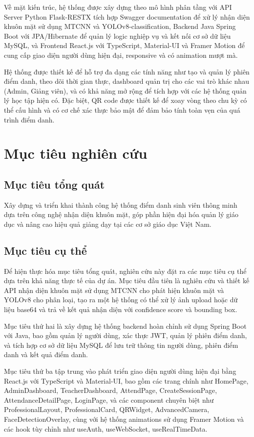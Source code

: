 \documentclass[12pt,a4paper]{report}
\begin{document}
Về mặt kiến trúc, hệ thống được xây dựng theo mô hình phân tầng với API Server Python Flask-RESTX tích hợp Swagger documentation để xử lý nhận diện khuôn mặt sử dụng MTCNN và YOLOv8-classification, Backend Java Spring Boot với JPA/Hibernate để quản lý logic nghiệp vụ và kết nối cơ sở dữ liệu MySQL, và Frontend React.js với TypeScript, Material-UI và Framer Motion để cung cấp giao diện người dùng hiện đại, responsive và có animation mượt mà.

Hệ thống được thiết kế để hỗ trợ đa dạng các tính năng như tạo và quản lý phiên điểm danh, theo dõi thời gian thực, dashboard quản trị cho các vai trò khác nhau (Admin, Giảng viên), và có khả năng mở rộng để tích hợp với các hệ thống quản lý học tập hiện có. Đặc biệt, QR code được thiết kế để xoay vòng theo chu kỳ có thể cấu hình và có cơ chế xác thực bảo mật để đảm bảo tính toàn vẹn của quá trình điểm danh.

\section{Mục tiêu nghiên cứu}
\subsection{Mục tiêu tổng quát}
Xây dựng và triển khai thành công hệ thống điểm danh sinh viên thông minh dựa trên công nghệ nhận diện khuôn mặt, góp phần hiện đại hóa quản lý giáo dục và nâng cao hiệu quả giảng dạy tại các cơ sở giáo dục Việt Nam.

\subsection{Mục tiêu cụ thể}
Để hiện thực hóa mục tiêu tổng quát, nghiên cứu này đặt ra các mục tiêu cụ thể dựa trên khả năng thực tế của dự án. Mục tiêu đầu tiên là nghiên cứu và thiết kế API nhận diện khuôn mặt sử dụng MTCNN cho phát hiện khuôn mặt và YOLOv8 cho phân loại, tạo ra một hệ thống có thể xử lý ảnh upload hoặc dữ liệu base64 và trả về kết quả nhận diện với confidence score và bounding box.

Mục tiêu thứ hai là xây dựng hệ thống backend hoàn chỉnh sử dụng Spring Boot với Java, bao gồm quản lý người dùng, xác thực JWT, quản lý phiên điểm danh, và tích hợp cơ sở dữ liệu MySQL để lưu trữ thông tin người dùng, phiên điểm danh và kết quả điểm danh.

Mục tiêu thứ ba tập trung vào phát triển giao diện người dùng hiện đại bằng React.js với TypeScript và Material-UI, bao gồm các trang chính như HomePage, AdminDashboard, TeacherDashboard, AttendPage, CreateSessionPage, AttendanceDetailPage, LoginPage, và các component chuyên biệt như ProfessionalLayout, ProfessionalCard, QRWidget, AdvancedCamera, FaceDetectionOverlay, cùng với hệ thống animations sử dụng Framer Motion và các hook tùy chỉnh như useAuth, useWebSocket, useRealTimeData.
\end{document}
